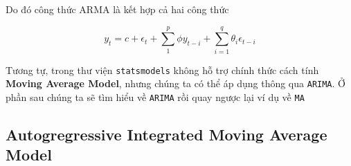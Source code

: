 \documentclass[
]{book}
\begin{document}
Do đó công thức ARMA là kết hợp cả hai công thức

\[
y_t = c + \epsilon_t + \sum^{p}_{1}\phi y_{t-i}  + \sum^{q}_{i=1}\theta_{i}\epsilon_{t-i}
\]

Tương tự, trong thư viện \texttt{statsmodels} không hỗ trợ chính thức cách tính \textbf{Moving Average Model}, nhưng chúng ta có thể áp dụng thông qua \texttt{ARIMA}. Ở phần sau chúng ta sẽ tìm hiểu về \texttt{ARIMA} rồi quay ngược lại ví dụ về \texttt{MA}

\hypertarget{autogregressive-integrated-moving-average-model}{%
\subsection{Autogregressive Integrated Moving Average Model}\label{autogregressive-integrated-moving-average-model}}

\printindex
\end{document}
